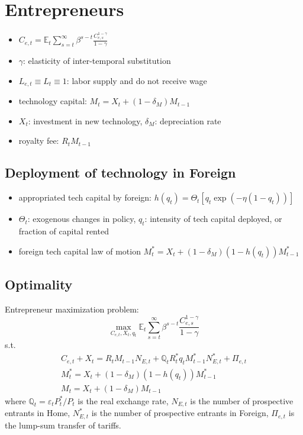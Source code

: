 \documentclass[10pt]{article} %
\begin{document}
\section{Entrepreneurs}
    \begin{itemize}
        \item $C_{e,t} = \mathbb{E}_t\sum\limits_{s=t}^{\infty}\beta^{s-t}\frac{C_{e,s}^{1-\gamma}}{1-\gamma}$
        \item $\gamma$: elasticity of inter-temporal substitution
        \item $L_{e,t} \equiv L_t \equiv 1$: labor supply and do not receive wage
        \item technology capital: $M_t = X_t + (1-\delta_M)M_{t-1}$
        \item $X_t$: investment in new technology, $\delta_M$: depreciation rate
        \item royalty fee: $R_t M_{t-1}$
    \end{itemize}
    \subsection{Deployment of technology in Foreign}
    \begin{itemize}
        \item appropriated tech capital by foreign: $h(q_t) = \Theta_t[q_t \exp(-\eta(1-q_t))]$
        \item $\Theta_t$: exogenous changes in policy, $q_t$: intensity of tech capital deployed, or fraction of capital rented
        \item foreign tech capital law of motion $M_t^* = X_t + (1-\delta_M) (1-h(q_t))M_{t-1}^*$
    \end{itemize}
    \subsection{Optimality}
    Entrepreneur maximization problem:
    \[
        \max\limits_{C_{e,t}, X_t, q_t} \mathbb{E}_t\sum\limits_{s=t}^{\infty}\beta^{s-t}\frac{C_{e,s}^{1-\gamma}}{1-\gamma}
    \]
    s.t.\begin{align*}
        C_{e,t} + X_t = R_t M_{t-1}N_{E,t} + \mathbb{Q}_t R_t^* q_t M_{t-1}^* N_{E,t}^* + \Pi_{e,t}\\
        M_t^* = X_t + (1-\delta_M) (1-h(q_t))M_{t-1}^*\\
        M_t = X_t + (1-\delta_M)M_{t-1}
    \end{align*}
    where $\mathbb{Q}_t = \varepsilon_t P_t^*/P_t$ is the real exchange rate, $N_{E,t}$ is the number of prospective entrants in Home, $N_{E,t}^*$ is the number of prospective entrants in Foreign, $\Pi_{e,t}$ is the lump-sum transfer of tariffs.
\end{document}
